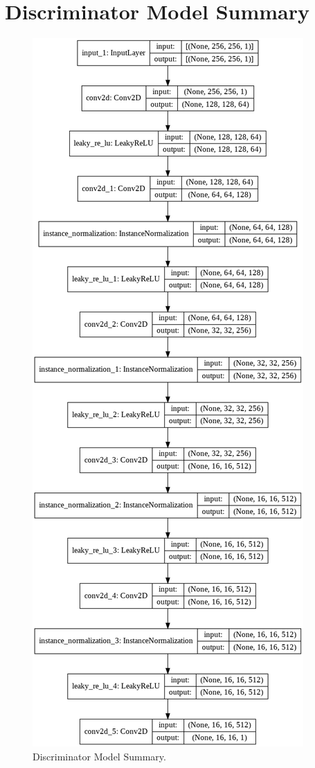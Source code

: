 \section{Discriminator Model Summary}
\begin{figure}[H]
	    \begin{center} \includegraphics[scale=0.35]{images/Appendix/DiscriminatorModelSummary.png}
	    \caption{Discriminator Model Summary.}
	    \label{fig:DiscriminatorModelSummary}
	    \end{center}
\end{figure}




